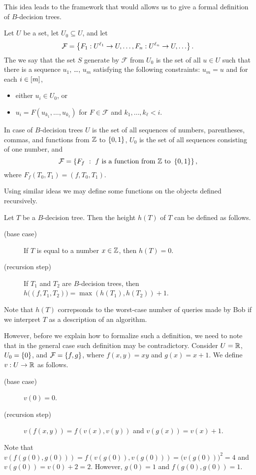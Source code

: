 This idea leads to the framework that would allows us to give a formal
definition of $B$-decision trees.
\begin{definition}
  Let $U$ be a set, let $U_0 \subseteq U$, and let
  \[
    \mathcal{F} =
    \set{F_1 : U^{\ell_1} \to U, \dots, F_n : U^{\ell_n} \to U, \dots}.
  \]
  The we say that the set $S$ generate by $\mathcal{F}$ from $U_0$ is
  the set of all $u \in U$ such that there is a sequence
  $u_1$, \dots, $u_m$ satisfying the following constraints: $u_m = u$ and
  for each $i \in {[{m}]}$,
  \begin{itemize}
    \item either $u_i \in U_0$, or
    \item $u_i = F(u_{k_1}, \dots, u_{k_\ell})$
      for $F \in \mathcal{F}$ and $k_1, \dots, k_\ell < i$.
  \end{itemize}
\end{definition}
In case of $B$-decision trees $U$ is the set of all sequences of numbers,
parentheses, commas, and functions from ${\mathbb{Z}}$ to $\set{0, 1}$,
$U_0$ is the set of all sequences consisting of one number, and
\[
  \mathcal{F} =
  \set[
    {
      f \text{ is a function from } \Z
        \text{ to } \set{0, 1}
    }
  ]{F_f},
\]
where $F_f(T_0, T_1) = (f, T_0, T_1)$.

Using similar ideas we may define some functions on the objects defined
recursively.
\begin{definition}
  Let $T$ be a $B$-decision tree. Then the height $h(T)$ of $T$ can be
  defined as follows.
  \begin{description}
      \item [(base case)] If $T$ is equal to a number $x \in {\mathbb{Z}}$,
        then $h(T) = 0$.
      \item[(recursion step)] If $T_1$ and $T_2$ are $B$-decision trees, then
        $h\big((f, T_1, T_2)\big) = \max(h(T_1), h(T_2)) + 1$.
  \end{description}
\end{definition}
Note that $h(T)$ correpsonds to the worst-case number of queries made by Bob if
we interpret $T$ as a description of an algorithm.

However, before we explain how to formalize such a definition, we need to note
that in the general case such definition may be contradictory. Consider
$U = {\mathbb{R}}$, $U_0 = \set{0}$, and $\mathcal{F} = \set{f, g}$, where $f(x, y) = xy$
and $g(x) = x + 1$. We define $v : U \to {\mathbb{R}}$ as follows.
\begin{description}
    \item [(base case)] $v(0) = 0$.
    \item[(recursion step)] $v(f(x, y)) = f(v(x), v(y))$ and
      $v(g(x)) = v(x) + 1$.
\end{description}
Note that $v(f(g(0), g(0))) = f(v(g(0)), v(g(0))) = \big(v(g(0))\big)^2 = 4$
and $v(g(0)) = v(0) + 2 = 2$.
However, $g(0) = 1$ and $f(g(0), g(0)) = 1$.

